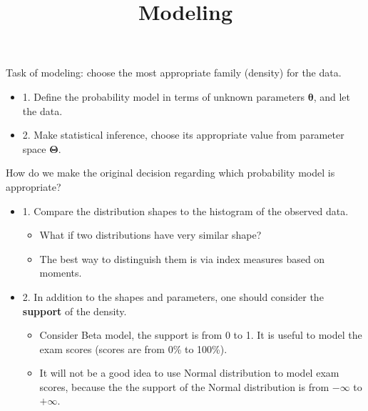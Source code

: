 \documentclass[12pt]{article}
\title{Modeling}
\author{}
\date{}
\begin{document}
\maketitle

Task of modeling: choose the most appropriate family (density) for the data.
\begin{itemize}
\item 1. Define the probability model in terms of unknown parameters $ \bm{\theta} $, and let
	the data.
\item 2. Make statistical inference, choose its appropriate value from parameter space 
	$ \bm{\Theta} $.
\end{itemize}
How do we make the original decision regarding which probability model is appropriate?
\begin{itemize}
\item 1. Compare the distribution shapes to the histogram of the observed data.
	\begin{itemize}
	\item What if two distributions have very similar shape?
	\item The best way to distinguish them is via index measures based on moments. 
	\end{itemize}
\item 2. In addition to the shapes and parameters, one should consider the {\textbf {support}}
	of the density.
	\begin{itemize}
	\item Consider Beta model, the support is from 0 to 1. It is useful to model the exam scores
		(scores are from 0\% to 100\%).
	\item It will not be a good idea to use Normal distribution to model exam scores, because the
		the support of the Normal distribution is from $  - \infty  $ to $  + \infty  $.
	\end{itemize}
\end{itemize}






\end{document}
